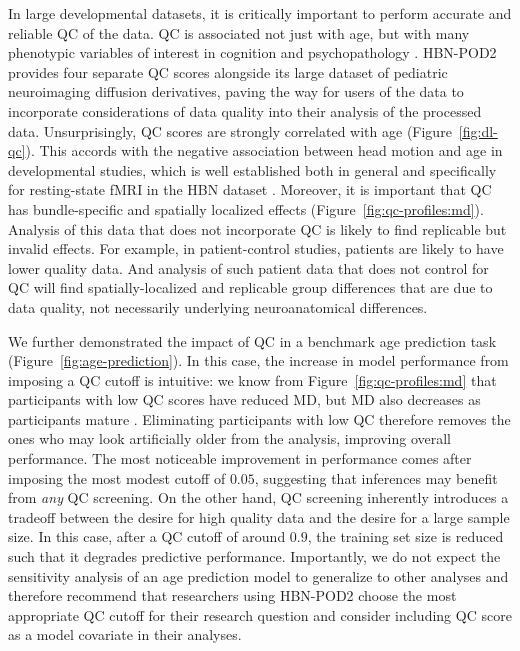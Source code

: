 \documentclass[fleqn,10pt,inline]{wlscirep}
\begin{document}
In large developmental datasets, it is critically important to perform accurate and reliable QC of
the data.
QC is associated not just with age, but with many
phenotypic variables of interest in cognition and psychopathology \cite{siegel2017quality}.
HBN-POD2 provides four separate QC scores alongside its large dataset
of pediatric neuroimaging diffusion derivatives, paving the way for users of the
data to incorporate considerations of data quality into their analysis of the
processed data. Unsurprisingly, QC scores are strongly correlated with
age (Figure~\ref{fig:dl-qc}). This accords with the negative association
between head motion and age in developmental studies, which is well established both in general
\cite{power2012spurious,satterthwaite2012impact,fair2012distinct,yendiki2014spurious}
and specifically for resting-state fMRI in the HBN dataset \cite{alexander2017-yc}.
Moreover, it is important that QC has bundle-specific and spatially localized effects (Figure~\ref{fig:qc-profiles:md}). Analysis of this data that does not incorporate QC is likely to find replicable but invalid effects. For example, in patient-control studies, patients are likely to have lower quality data. And analysis of such patient data that does not control for QC will find spatially-localized and replicable group differences that are due to data quality, not necessarily underlying neuroanatomical differences.

We further demonstrated the impact of QC in a benchmark age prediction task
(Figure~\ref{fig:age-prediction}). In this case, the increase in model performance
from imposing a QC cutoff is intuitive: we know from
Figure~\ref{fig:qc-profiles:md} that participants with low QC scores have
reduced MD, but MD also decreases as participants mature
\cite{yeatman2014lifespan,richie-halford2021multidimensional}. Eliminating
participants with low QC therefore removes the ones who may look artificially older
from the analysis, improving overall performance. The most noticeable
improvement in performance comes after imposing the most modest cutoff of
$0.05$, suggesting that inferences may benefit from \emph{any} QC screening. On
the other hand, QC screening inherently introduces a tradeoff between the desire
for high quality data and the desire for a large sample size. In this case,
after a QC cutoff of around $0.9$, the training set size is reduced such that it
degrades predictive performance. Importantly, we do not expect the sensitivity
analysis of an age prediction model to generalize to other analyses and therefore
recommend that researchers using HBN-POD2 choose the most appropriate QC cutoff for their research question and consider including QC score as a model covariate in their analyses.
\end{document}
